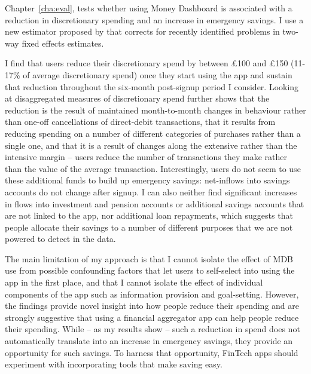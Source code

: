 Chapter~\ref{cha:eval}, tests whether using Money Dashboard is associated with
a reduction in discretionary spending and an increase in emergency savings. I
use a new estimator proposed by \citet{callaway2021difference} that corrects
for recently identified problems in two-way fixed effects estimates.

I find that users reduce their discretionary spend by between \pounds100 and
\pounds150 (11-17\% of average discretionary spend) once they start using the
app and sustain that reduction throughout the six-month post-signup period I
consider. Looking at disaggregated measures of discretionary spend further
shows that the reduction is the result of maintained month-to-month changes in
behaviour rather than one-off cancellations of direct-debit transactions, that
it results from reducing spending on a number of different categories of
purchases rather than a single one, and that it is a result of changes along
the extensive rather than the intensive margin -- users reduce the number of
transactions they make rather than the value of the average transaction.
Interestingly, users do not seem to use these additional funds to build up
emergency savings: net-inflows into savings accounts do not change after
signup. I can also neither find significant increases in flows into investment
and pension accounts or additional savings accounts that are not linked to the
app, nor additional loan repayments, which suggests that people allocate their
savings to a number of different purposes that we are not powered to detect in
the data.

The main limitation of my approach is that I cannot isolate the effect of MDB
use from possible confounding factors that let users to self-select into using
the app in the first place, and that I cannot isolate the effect of individual
components of the app such as information provision and goal-setting. However, the findings provide novel insight into how people reduce their
spending and are strongly suggestive that using a financial aggregator app can
help people reduce their spending. While -- as my results show -- such a
reduction in spend does not automatically translate into an increase in
emergency savings, they provide an opportunity for such savings. To harness
that opportunity, FinTech apps should experiment with incorporating tools that
make saving easy.

